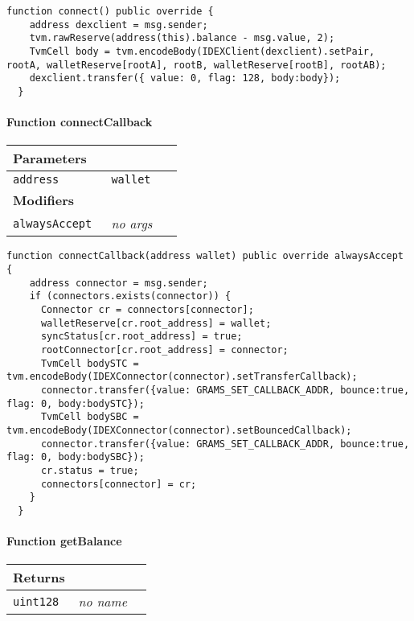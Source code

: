 \begin{lstlisting}[firstnumber=149]
  function connect() public override {
    address dexclient = msg.sender;
    tvm.rawReserve(address(this).balance - msg.value, 2);
    TvmCell body = tvm.encodeBody(IDEXClient(dexclient).setPair, rootA, walletReserve[rootA], rootB, walletReserve[rootB], rootAB);
    dexclient.transfer({ value: 0, flag: 128, body:body});
  }
\end{lstlisting}

\paragraph{Function connectCallback}


\ifsoltables
\noindent\begin{tabular}{|l|l|p{5cm}|}\hline
\multicolumn{3}{|l|}{\bf Parameters}\\\hline
\tt address & \tt wallet &\\\hline
\multicolumn{3}{|l|}{\bf Modifiers}\\\hline
\tt alwaysAccept & {\em no args} &\\\hline
\end{tabular}
\fi

\vspace{2cm}

\begin{lstlisting}[firstnumber=132]
  function connectCallback(address wallet) public override alwaysAccept {
    address connector = msg.sender;
    if (connectors.exists(connector)) {
      Connector cr = connectors[connector];
      walletReserve[cr.root_address] = wallet;
      syncStatus[cr.root_address] = true;
      rootConnector[cr.root_address] = connector;
      TvmCell bodySTC = tvm.encodeBody(IDEXConnector(connector).setTransferCallback);
      connector.transfer({value: GRAMS_SET_CALLBACK_ADDR, bounce:true, flag: 0, body:bodySTC});
      TvmCell bodySBC = tvm.encodeBody(IDEXConnector(connector).setBouncedCallback);
      connector.transfer({value: GRAMS_SET_CALLBACK_ADDR, bounce:true, flag: 0, body:bodySBC});
      cr.status = true;
      connectors[connector] = cr;
    }
  }
\end{lstlisting}

\paragraph{Function getBalance}


\ifsoltables
\noindent\begin{tabular}{|l|l|p{5cm}|}\hline
\multicolumn{3}{|l|}{\bf Returns}\\\hline
\tt uint128 & {\em no name} &\\\hline
\end{tabular}
\fi

